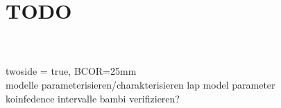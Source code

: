\chapter*{TODO}
\cite{Angles2019}\\
\cite{Callaghan2019}\\
% 
twoside = true, BCOR=25mm\\
modelle parameterisieren/charakterisieren
lap model parameter\\
koinfedence intervalle bambi verifizieren?\\
